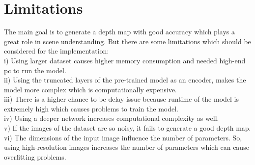 \documentclass[a4paper,12pt,oneside]{book}
\begin{document}
\section{Limitations}
The main goal is to generate a depth map with good accuracy which plays a great role in scene understanding. But there are some limitations which should be considered for the implementation:\\
i) Using larger dataset causes higher memory consumption and needed high-end pc to run the model.\\
ii) Using the truncated layers of the pre-trained model as an encoder, makes the model more complex which is computationally expensive.\\
iii) There is a higher chance to be delay issue because runtime of the model is extremely high which causes problems to train the model.\\
iv) Using a deeper network increases computational complexity as well.\\
v) If the images of the dataset are so noisy, it fails to generate a good depth map.\\
vi) The dimensions of the input image influence the number of parameters. So, using high-resolution images increases the number of parameters which can cause overfitting problems.
\end{document}
